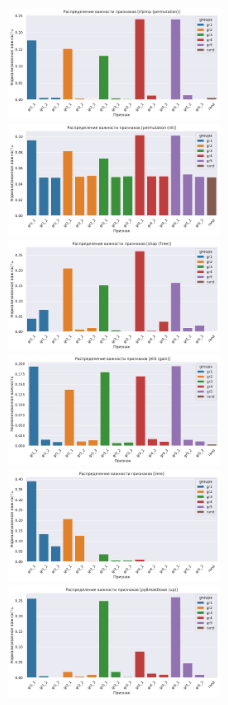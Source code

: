 \documentclass[12pt]{article}
\begin{document}
\begin{figure}[h]
        \includegraphics[width=0.5\textwidth]{images/TargetSum_allFeatures_rfpimp (permutation).pdf}
        \includegraphics[width=0.5\textwidth]{images/TargetSum_allFeatures_permutation (nll).pdf}
        \includegraphics[width=0.5\textwidth]{images/TargetSum_allFeatures_shap (Tree).pdf}
        \includegraphics[width=0.5\textwidth]{images/TargetSum_allFeatures_eli5 (gain).pdf}
        \hfill
        \includegraphics[width=0.5\textwidth]{images/TargetSum_allFeatures_lime.pdf}
        \includegraphics[width=0.5\textwidth]{images/TargetSum_allFeatures_pyBreakDown (up).pdf}

\end{figure}
\end{document}
